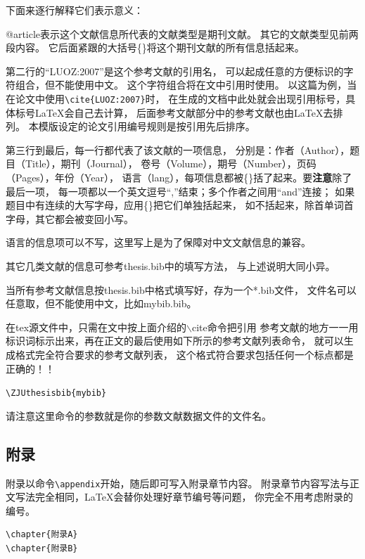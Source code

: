 下面来逐行解释它们表示意义：

@article表示这个文献信息所代表的文献类型是期刊文献。
其它的文献类型见前两段内容。
它后面紧跟的大括号\{\}将这个期刊文献的所有信息括起来。

第二行的“LUOZ:2007”是这个参考文献的引用名，
可以起成任意的方便标识的字符组合，但不能使用中文。
这个字符组合将在文中引用时使用。
以这篇为例，当在论文中使用\verb+\cite{LUOZ:2007}+时，
在生成的文档中此处就会出现引用标号，具体标号\LaTeX 会自己去计算，
后面参考文献部分中的参考文献也由\LaTeX 去排列。
本模版设定的论文引用编号规则是按引用先后排序。

第三行到最后，每一行都代表了该文献的一项信息，
分别是：作者（Author），题目（Title），期刊（Journal），
卷号（Volume），期号（Number），页码（Pages），年份（Year），
语言（lang），每项信息都被\{\}括了起来。要{\bfseries 注意}除了最后一项，
每一项都以一个英文逗号“,”结束；多个作者之间用“and”连接；
如果题目中有连续的大写字母，应用\{\}把它们单独括起来，
如不括起来，除首单词首字母，其它都会被变回小写。

语言的信息项可以不写，这里写上是为了保障对中文文献信息的兼容。

其它几类文献的信息可参考thesis.bib中的填写方法，
与上述说明大同小异。

当所有参考文献信息按thesis.bib中格式填写好，存为一个*.bib文件，
文件名可以任意取，但不能使用中文，比如mybib.bib。

在tex源文件中，只需在文中按上面介绍的$\backslash$cite命令把引用
参考文献的地方一一用标识词标示出来，再在正文的最后使用如下所示的参考文献列表命令，
就可以生成格式完全符合要求的参考文献列表，
这个格式符合要求包括任何一个标点都是正确的！！

\verb+\ZJUthesisbib{mybib}+

请注意这里命令的参数就是你的参数文献数据文件的文件名。


\subsection{附录}

附录以命令\verb+\appendix+开始，随后即可写入附录章节内容。
附录章节内容写法与正文写法完全相同，\LaTeX 会替你处理好章节编号等问题，
你完全不用考虑附录的编号。

{
\linespread{1}
\noindent
\begin{verbatim}
\chapter{附录A}
\chapter{附录B}
\end{verbatim}
}

